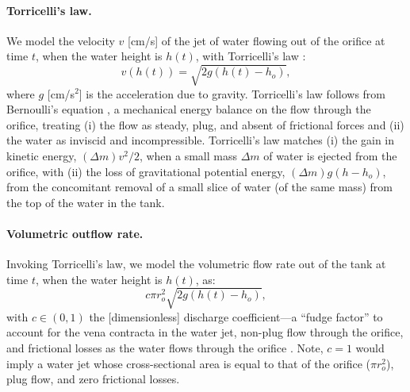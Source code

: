 \documentclass[openacc]{rsproca_new}%
\begin{document}
\paragraph{Torricelli's law.}
We model the velocity $v$ [cm/s] of the jet of water flowing out of the orifice at time $t$, when the water height is $h(t)$, with Torricelli's law \cite{d2021torricelli}:
\begin{equation}
	v(h(t)) =  \sqrt{2 g(h(t)-h_o)}, \label{eq:Torricelli}
\end{equation} where $g$ [cm/s$^2$] is the acceleration due to gravity. Torricelli's law follows from Bernoulli's equation \cite{welty2020fundamentals}, a mechanical energy balance on the flow through the orifice, treating (i) the flow as steady, plug, and absent of frictional forces and (ii) the water as inviscid and incompressible.
Torricelli's law matches (i) the gain in kinetic energy, $(\Delta m) v^2/2$, when a small mass $\Delta m$ of water is ejected from the orifice, with (ii) the loss of gravitational potential energy, $(\Delta m)g(h-h_o)$, from the concomitant removal of a small slice of water (of the same mass) from the top of the water in the tank. \cite{groetsch1993inverse,driver1998torricelli,williams2021vessel}

\paragraph{Volumetric outflow rate.}
Invoking Torricelli's law, we model the volumetric flow rate out of the tank at time $t$, when the water height is $h(t)$, as:
\begin{equation}
	c \pi r_o^2 \sqrt{2 g(h(t)-h_o)}, \label{eq:outletflow}
\end{equation}
with $c\in(0,1)$ the [dimensionless] discharge coefficient---a ``fudge factor'' to account for the vena contracta in the water jet, non-plug flow through the orifice, and frictional losses as the water flows through the orifice \cite{horsch2020simple,teoman2022discharge,hicks2014determining,blasone2015discharge,lienhard1984velocity,wadhwa2021study}. 
Note, $c=1$ would imply a water jet whose cross-sectional area is equal to that of the orifice ($\pi r_o^2$), plug flow, and zero frictional losses.
\end{document}
